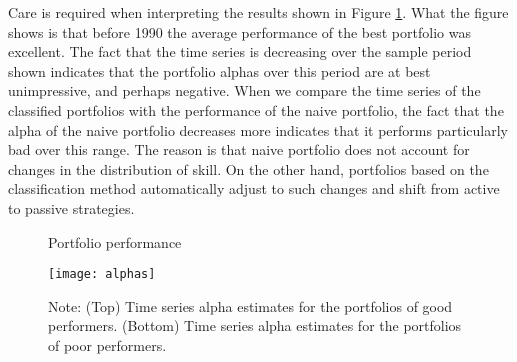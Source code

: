 Care is required when interpreting the results shown in Figure \ref{fig:performance}.  What the figure shows is that before 1990 the average performance of the best portfolio was excellent.  The fact that the time series is decreasing over the sample period shown indicates that the portfolio alphas over this period are at best unimpressive, and perhaps negative.  When we compare the time series of the classified portfolios with the performance of the naive portfolio, the fact that the alpha of the naive portfolio decreases more indicates that it performs particularly bad over this range. The reason is that naive portfolio does not account for changes in the distribution of skill.  On the other hand, portfolios based on the classification method automatically adjust to such changes and shift from active to passive strategies.


\begin{figure}[ht!]
\small
\centering
\captionsetup{labelsep=colon, font=footnotesize, justification=centerfirst, width=\linewidth}
\caption{Portfolio performance}
\label{fig:performance}
\centering
\texttt{[image: alphas]}
\captionsetup{font=footnotesize, justification=justified, width=\textwidth}
\caption*{Note: (Top) Time series alpha estimates for the portfolios of good performers. (Bottom) Time series alpha estimates for the portfolios of poor performers.}
\end{figure}

